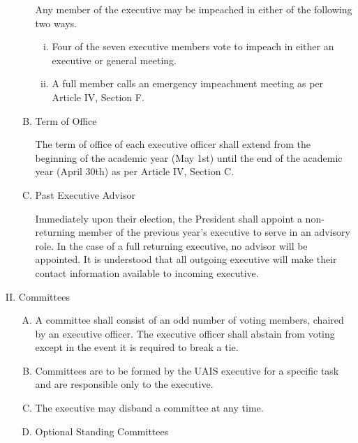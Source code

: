 \documentclass[11pt]{article}
\begin{document}
\begin{enumerate}[I.]
\begin{enumerate}[A)]
        Any member of the executive may be impeached in either of the
        following two ways.
          \begin{enumerate}[i)]
            \item Four of the seven executive members vote to impeach in
              either an executive or general meeting.
            \item A full member calls an emergency impeachment meeting as per Article IV, Section F.
          \end{enumerate}
        \item Term of Office

        The term of office of each executive officer shall extend from the beginning of the academic year (May 1st)
        until the end of the academic year (April 30th) as per Article IV, Section C.

        \item Past Executive Advisor

        Immediately upon their election, the President shall appoint a
        non-returning member of the previous year's executive to serve in an
        advisory role. In the case of a full returning executive, no advisor
        will be appointed. It is understood that all outgoing executive will
        make their contact information available to incoming executive.
    \end{enumerate}
  \item Committees
    \begin{enumerate}[A)]
      \item A committee shall consist of an odd number of voting members,
        chaired by an executive officer. The executive officer shall abstain
        from voting except in the event it is required to break a tie.
      \item Committees are to be formed by the UAIS executive for a specific task and are responsible only to the executive.
      \item The executive may disband a committee at any time.
      \item Optional Standing Committees


\end{enumerate}
\end{enumerate}
\end{document}
